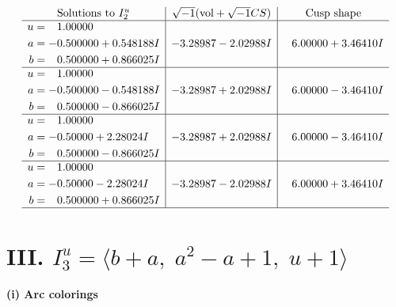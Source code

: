 \documentclass[1p]{elsarticle_modified}
\theoremstyle{definition}
\newcommand{\I}{\sqrt{-1}}
\begin{document}
$$\begin{array}{c|c|c}  
\text{Solutions to }I^u_{2}& \I (\text{vol} + \sqrt{-1}CS) & \text{Cusp shape}\\
 \hline 
\begin{aligned}
u &= \phantom{-}1.00000\phantom{ +0.000000I} \\
a &= -0.500000 + 0.548188 I \\
b &= \phantom{-}0.500000 + 0.866025 I\end{aligned}
 & -3.28987 - 2.02988 I & \phantom{-}6.00000 + 3.46410 I \\ \hline\begin{aligned}
u &= \phantom{-}1.00000\phantom{ +0.000000I} \\
a &= -0.500000 - 0.548188 I \\
b &= \phantom{-}0.500000 - 0.866025 I\end{aligned}
 & -3.28987 + 2.02988 I & \phantom{-}6.00000 - 3.46410 I \\ \hline\begin{aligned}
u &= \phantom{-}1.00000\phantom{ +0.000000I} \\
a &= -0.50000 + 2.28024 I \\
b &= \phantom{-}0.500000 - 0.866025 I\end{aligned}
 & -3.28987 + 2.02988 I & \phantom{-}6.00000 - 3.46410 I \\ \hline\begin{aligned}
u &= \phantom{-}1.00000\phantom{ +0.000000I} \\
a &= -0.50000 - 2.28024 I \\
b &= \phantom{-}0.500000 + 0.866025 I\end{aligned}
 & -3.28987 - 2.02988 I & \phantom{-}6.00000 + 3.46410 I\\
 \hline 
 \end{array}$$\newpage\newpage\renewcommand{\arraystretch}{1}
\centering \section*{III. $I^u_{3}= \langle b+a,\;a^2- a+1,\;u+1 \rangle$}
\flushleft \textbf{(i) Arc colorings}\\
\end{document}
